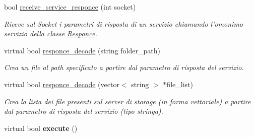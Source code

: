 \begin{DoxyCompactItemize}
bool \hyperlink{class_service_a3e86a7b9b19d5ff72c952f980b61e3d8}{receive\-\_\-service\-\_\-responce} (int socket)
\begin{DoxyCompactList}\small\item\em Riceve sul {\itshape Socket} i parametri di risposta di un servizio chiamando l'omonimo servizio della classe {\ttfamily \hyperlink{class_responce}{Responce}}. \end{DoxyCompactList}\item 
virtual bool \hyperlink{class_service_a4aed56f17af847cab41a911c1555ac2a}{responce\-\_\-decode} (string folder\-\_\-path)
\begin{DoxyCompactList}\small\item\em Crea un file al path specificato a partire dal parametro di risposta del servizio. \end{DoxyCompactList}\item 
virtual bool \hyperlink{class_service_af6bbad3f7fa3d4ee685a97f8022752e5}{responce\-\_\-decode} (vector$<$ string $>$ $\ast$file\-\_\-list)
\begin{DoxyCompactList}\small\item\em Crea la lista dei file presenti sul server di storage (in forma vettoriale) a partire dal parametro di risposta del servizio (tipo stringa). \end{DoxyCompactList}\item 
\hypertarget{class_service_aef1e4cf743a29f48b3708915f2bb2f37}{virtual bool {\bfseries execute} ()}\label{class_service_aef1e4cf743a29f48b3708915f2bb2f37}

\end{DoxyCompactItemize}
